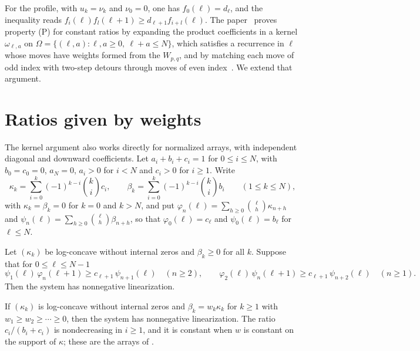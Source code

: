 For the profile, with $u_k=\nu_k$ and $\nu_0=0$, one has $f_0(\ell)=d_\ell$, and the inequality reads $f_i(\ell)f_l(\ell+1)\geq d_{\ell+1}f_{i+l}(\ell)$. The paper~\cite{P1} proves property (P) for constant ratios by expanding the product coefficients in a kernel $\omega_{\ell,a}$ on $\Omega=\{(\ell,a):\ell,a\geq0,\ \ell+a\leq N\}$, which satisfies a recurrence in $\ell$ whose moves have weights formed from the $W_{p,q}$, and by matching each move of odd index with two-step detours through moves of even index~\cite[Lemmas~ and~]{P1}. We extend that argument.

\section{Ratios given by weights}\label{sec:vary}

The kernel argument also works directly for normalized arrays, with independent diagonal and downward coefficients. Let $a_i+b_i+c_i=1$ for $0\leq i\leq N$, with $b_0=c_0=0$, $a_N=0$, $a_i>0$ for $i<N$ and $c_i>0$ for $i\geq1$. Write
\[
\kappa_k=\sum_{i=0}^k(-1)^{k-i}\binom kic_i,\qquad\beta_k=\sum_{i=0}^k(-1)^{k-i}\binom kib_i\qquad(1\leq k\leq N),
\]
with $\kappa_k=\beta_k=0$ for $k=0$ and $k>N$, and put $\varphi_n(\ell)=\sum_{h\geq0}\binom\ell h\kappa_{n+h}$ and $\psi_n(\ell)=\sum_{h\geq0}\binom\ell h\beta_{n+h}$, so that $\varphi_0(\ell)=c_\ell$ and $\psi_0(\ell)=b_\ell$ for $\ell\leq N$.

\begin{theorem}\label{thm:lc-vary}
Let $(\kappa_k)$ be log-concave without internal zeros and $\beta_k\geq0$ for all $k$. Suppose that for $0\leq\ell\leq N-1$
\[
\psi_1(\ell)\,\varphi_n(\ell+1)\geq c_{\ell+1}\,\psi_{n+1}(\ell)\quad(n\geq2),\qquad\varphi_2(\ell)\,\psi_n(\ell+1)\geq c_{\ell+1}\,\psi_{n+2}(\ell)\quad(n\geq1).
\]
Then the system has nonnegative linearization.
\end{theorem}

\begin{corollary}\label{cor:lc-vary}
If $(\kappa_k)$ is log-concave without internal zeros and $\beta_k=w_k\kappa_k$ for $k\geq1$ with $w_1\geq w_2\geq\cdots\geq0$, then the system has nonnegative linearization. The ratio $c_i/(b_i+c_i)$ is nondecreasing in $i\geq1$, and it is constant when $w$ is constant on the support of $\kappa$; these are the arrays of \cite[Theorem~]{P1}.
\end{corollary}

